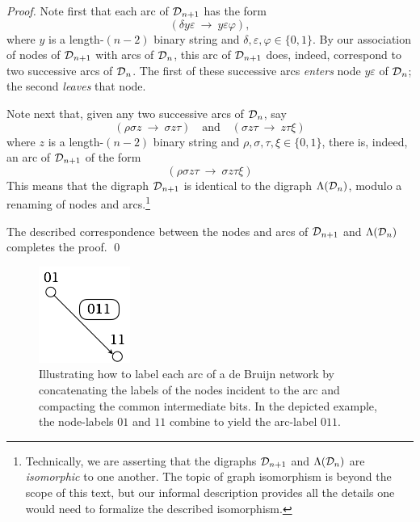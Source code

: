 {\begin{proof}
\smallskip

Note first that each arc of $\mbox{$\cal D$}_{n+1}$ has the form
\[ (\delta y \varepsilon \ \rightarrow \ y \varepsilon \varphi), \]
where $y$ is a length-$(n-2)$ binary string and $\delta, \varepsilon,
\varphi \in \{0,1\}$.  By our association of nodes of $\mbox{$\cal D$}_{n+1}$ with
arcs of $\mbox{$\cal D$}_n$, this arc of $\mbox{$\cal D$}_{n+1}$ does, indeed, correspond to two
successive arcs of $\mbox{$\cal D$}_n$.   The first of these successive arcs
{\em enters} node $y \varepsilon$ of $\mbox{$\cal D$}_n$; the second {\em leaves}
that node.

Note next that, given any two successive arcs of $\mbox{$\cal D$}_n$, say
\[
(\rho \sigma z \ \rightarrow \ \sigma z \tau) \ \ \ \mbox { and } \ \ \
(\sigma z \tau \ \rightarrow \  z \tau \xi)
\]
where $z$ is a length-$(n-2)$ binary string and $\rho, \sigma, \tau,
\xi \in \{0,1\}$, there is, indeed, an arc of $\mbox{$\cal D$}_{n+1}$ of the form
\[ (\rho \sigma z \tau \ \rightarrow \ \sigma z \tau \xi) \]
This means that the digraph $\mbox{$\cal D$}_{n+1}$ is identical to the digraph
$\Lambda(\mbox{$\cal D$}_n)$, modulo a renaming of nodes and arcs.\footnote{Technically,
  we are asserting that the digraphs ${\cal D}_{n+1}$ and ${\Lambda}({\cal D}_n)$ 
  are {\it isomorphic} to one another.  The topic of
  graph isomorphism is beyond the scope of this text, but our informal
  description provides all the details one would need to formalize the
  described isomorphism.}

The described correspondence between the nodes and arcs of $\mbox{$\cal D$}_{n+1}$
and $\Lambda(\mbox{$\cal D$}_n)$ completes the proof.  \qed
\end{proof}

\begin{figure}[hbt]
\begin{center}
       \includegraphics[scale=0.6]{FiguresGraph/dBlabelEdge}
\caption{Illustrating how to label each arc of a de Bruijn network by
  concatenating the labels of the nodes incident to the arc and
  compacting the common intermediate bits.  In the depicted example,
  the node-labels $01$ and $11$ combine to yield the arc-label $011$.}
  \label{fig:dBlabelEdge}
\end{center}
\end{figure}

}
